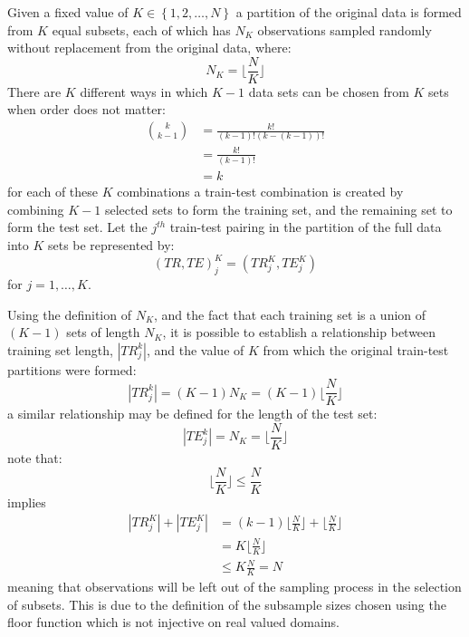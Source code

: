 \documentclass[12pt,]{article}
\begin{document}
Given a fixed value of \(K \in \left \{ 1, 2, \ldots, N \right \}\) a
partition of the original data is formed from \(K\) equal subsets, each
of which has \(N_{K}\) observations sampled randomly without replacement
from the original data, where:
\[N_{K}=\Big \lfloor \frac{N}{K} \Big \rfloor\] There are \(K\)
different ways in which \(K-1\) data sets can be chosen from \(K\) sets
when order does not matter: \begin{align*}
\binom{k}{k-1} &= \frac{k!}{(k-1)!(k-(k-1))!}\\[0.5em]
&= \frac{k!}{(k-1)!}\\[0.5em]
&= k
\end{align*} for each of these \(K\) combinations a train-test
combination is created by combining \(K-1\) selected sets to form the
training set, and the remaining set to form the test set. Let the
\(j^{th}\) train-test pairing in the partition of the full data into
\(K\) sets be represented by:
\[\left(TR, TE \right)^{K}_{j}=\left(TR_{j}^{K}, TE_{j}^{K} \right) \]
for \(j=1, \ldots, K\).

Using the definition of \(N_{K}\), and the fact that each training set
is a union of \(\left(K-1 \right)\) sets of length \(N_{K}\), it is
possible to establish a relationship between training set length,
\(|TR_{j}^{k}|\), and the value of \(K\) from which the original
train-test partitions were formed:\\
\[|TR_{j}^{k}|=(K-1)N_{K}=(K-1)\Big \lfloor \frac{N}{K} \Big \rfloor\] a
similar relationship may be defined for the length of the test set:
\[|TE_{j}^{k}|=N_{K}=\Big \lfloor \frac{N}{K} \Big \rfloor\] note that:
\[\Big \lfloor \frac{N}{K} \Big \rfloor \leq \frac{N}{K}\] implies
\begin{align*}
|TR_{j}^{K}| + |TE_{j}^{K}| &= (k-1)\Big \lfloor \frac{N}{K} \Big \rfloor + \Big \lfloor \frac{N}{K} \Big \rfloor \\[0.5em]
&= K \Big \lfloor \frac{N}{K} \Big \rfloor \\[0.5em]
&\leq K \frac{N}{K} = N
\end{align*} meaning that observations will be left out of the sampling
process in the selection of subsets. This is due to the definition of
the subsample sizes chosen using the floor function which is not
injective on real valued domains.
\end{document}
